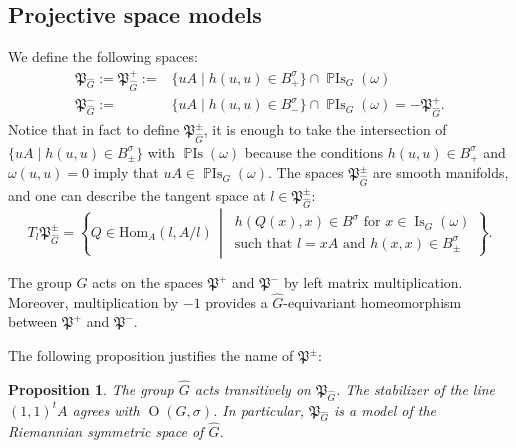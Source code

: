 \documentclass[a4paper,oneside,11pt]{amsart}
\DeclareMathOperator{\OO}{O}
\DeclareMathOperator{\Is}{Is}
\DeclareMathOperator{\PIs}{\mathbb{P}Is}
\newcommand{\midwd}{\,\middle\vert\,}
\theoremstyle{plain}
\newtheorem{prop}[teo]{Proposition}
\theoremstyle{definition}
\theoremstyle{remark}
\begin{document}
\subsection{Projective space models}

We define the following spaces: 
\begin{align*}
    \mathfrak P_{\hat G}:=\mathfrak P_{\hat G}^+:=&\{uA \mid h(u,u)\in B^\sigma_+\}\cap\PIs_G(\omega)\\
    \mathfrak P_{\hat G}^-:=&\{uA \mid h(u,u)\in B^\sigma_-\}\cap\PIs_G(\omega)=-\mathfrak P_{\hat G}^+.
\end{align*}
Notice that in fact to define $\mathfrak P_{\hat G}^\pm$, it is enough to take the intersection of $\{uA \mid h(u,u)\in B^\sigma_\pm\}$ with $\PIs(\omega)$ because the conditions $h(u,u)\in B^\sigma_+$ and $\omega(u,u)=0$ imply that $uA\in \PIs_G(\omega)$. The spaces $\mathfrak P_{\hat G}^\pm$ are smooth manifolds, and one can describe the tangent space at $l\in \mathfrak P_{\hat G}^\pm$:
\begin{equation*}
    T_l\mathfrak P_{\hat G}^\pm=\left\{Q\in\mathrm{Hom}_A(l,A/l)\midwd\begin{array}{l} h(Q(x),x)\in B^{\sigma}\text{ for $x\in\Is_G(\omega)$}\\ \text{such that $l=xA$ and $h(x,x)\in B^\sigma_\pm$}
    \end{array}\right\}.
\end{equation*}

The group $\hat G$ acts on the spaces $\mathfrak P^+$ and $\mathfrak P^-$ by left matrix multiplication. Moreover, multiplication by $-1$ provides a $\hat G$-equivariant homeomorphism between $\mathfrak P^+$ and $\mathfrak P^-$.

The following proposition justifies the name of $\mathfrak P^\pm$:

\begin{prop}
    The group $\hat G$ acts transitively on $\mathfrak P_{\hat G}$. The stabilizer of the line $(1,1)^tA$ agrees with $\OO(G,\sigma)$. In particular, $\mathfrak P_{\hat G}$ is a model of the Riemannian symmetric space of $\hat G$.  
\end{prop}
\end{document}
